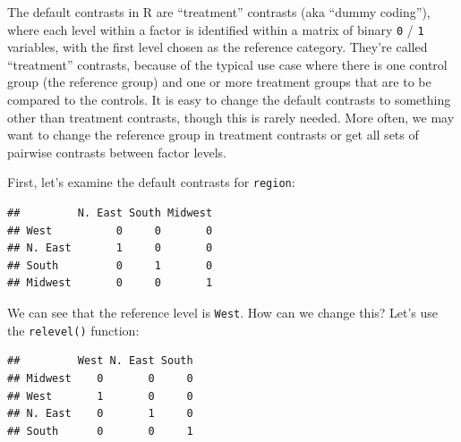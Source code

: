 \documentclass[
]{book}
\newenvironment{Shaded}{\begin{snugshade}}{\end{snugshade}}
\newcommand{\CommentTok}[1]{\textcolor[rgb]{0.56,0.35,0.01}{\textit{#1}}}
\newcommand{\DataTypeTok}[1]{\textcolor[rgb]{0.13,0.29,0.53}{#1}}
\newcommand{\KeywordTok}[1]{\textcolor[rgb]{0.13,0.29,0.53}{\textbf{#1}}}
\newcommand{\NormalTok}[1]{#1}
\newcommand{\OperatorTok}[1]{\textcolor[rgb]{0.81,0.36,0.00}{\textbf{#1}}}
\newcommand{\StringTok}[1]{\textcolor[rgb]{0.31,0.60,0.02}{#1}}
\begin{document}
The default contrasts in R are ``treatment'' contrasts (aka ``dummy coding''), where each level within a factor is identified within a matrix of binary \texttt{0} / \texttt{1} variables, with the first level chosen as the reference category. They're called ``treatment'' contrasts, because of the typical use case where there is one control group (the reference group) and one or more treatment groups that are to be compared to the controls. It is easy to change the default contrasts to something other than treatment contrasts, though this is rarely needed. More often, we may want to change the reference group in treatment contrasts or get all sets of pairwise contrasts between factor levels.

First, let's examine the default contrasts for \texttt{region}:

\begin{Shaded}
\end{Shaded}

\begin{verbatim}
##         N. East South Midwest
## West          0     0       0
## N. East       1     0       0
## South         0     1       0
## Midwest       0     0       1
\end{verbatim}

We can see that the reference level is \texttt{West}. How can we change this? Let's use the \texttt{relevel()} function:

\begin{Shaded}
\end{Shaded}

\begin{verbatim}
##         West N. East South
## Midwest    0       0     0
## West       1       0     0
## N. East    0       1     0
## South      0       0     1
\end{verbatim}
\end{document}
